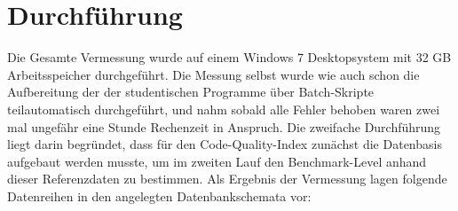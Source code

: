 \documentclass[da,ngerman]{stthesis}
\begin{document}
  		\section{Durchführung} \label{messungchapter}
  			Die Gesamte Vermessung wurde auf einem Windows 7 Desktopsystem mit 32 GB Arbeitsspeicher durchgeführt. Die Messung selbst wurde wie auch schon die Aufbereitung der der studentischen Programme über Batch-Skripte teilautomatisch durchgeführt, und nahm sobald alle Fehler behoben waren zwei mal ungefähr eine Stunde Rechenzeit in Anspruch. Die zweifache Durchführung liegt darin begründet, dass für den Code-Quality-Index zunächst die Datenbasis aufgebaut werden musste, um im zweiten Lauf den Benchmark-Level anhand dieser Referenzdaten zu bestimmen. \newline
  			Als Ergebnis der Vermessung lagen folgende Datenreihen in den angelegten Datenbankschemata vor:
\end{document}
